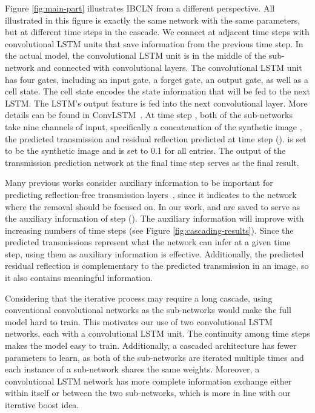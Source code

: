 \documentclass[10pt,twocolumn,letterpaper]{article}
\begin{document}
Figure \ref{fig:main-part} illustrates IBCLN from a different perspective. All  illustrated in this figure is exactly the same network with the same parameters, but at different time steps in the cascade. We connect  at adjacent time steps with convolutional LSTM units that save information from the previous time step. In the actual model, the convolutional LSTM unit is in the middle of the sub-network and connected with convolutional layers. The convolutional LSTM unit has four gates, including an input gate, a forget gate, an output gate, as well as a cell state. The cell state encodes the state information that will be fed to the next LSTM. The LSTM’s output feature is fed into the next convolutional layer. More details can be found in ConvLSTM~\cite{xingjian2015convolutional}. At time step , both of the sub-networks take nine channels of input, specifically a concatenation of the synthetic image , the predicted transmission  and residual reflection  predicted at time step  ().  is set to be the synthetic image  and  is set to 0.1 for all entries. The output of the transmission prediction network  at the final time step  serves as the final result.

Many previous works consider auxiliary information to be important for predicting reflection-free transmission layers~\cite{fan2017generic, yang2018seeing, wan2018crrn, wen2019single}, since it indicates to the network where the removal should be focused on. In our work,  and  are saved to serve as the auxiliary information of step  (). The auxiliary information will improve with increasing numbers of time steps (see Figure \ref{fig:cascading-results}). Since the predicted transmissions represent what the network can infer at a given time step,
using them as auxiliary information is effective. Additionally, the predicted residual reflection is complementary to the predicted transmission in an image, so it also contains meaningful information. 

Considering that the iterative process may require a long cascade, using conventional convolutional networks as the sub-networks would make the full model hard to train. This motivates our use of two convolutional LSTM networks, each with a convolutional LSTM unit. The continuity among time steps makes the model easy to train. 
Additionally, a cascaded architecture has fewer parameters to learn, as both of the sub-networks are iterated multiple times and each instance of a sub-network shares the same weights.
Moreover, a convolutional LSTM network has more complete information exchange either within itself or between the two sub-networks, which is more in line with our iterative boost idea. 
\end{document}
